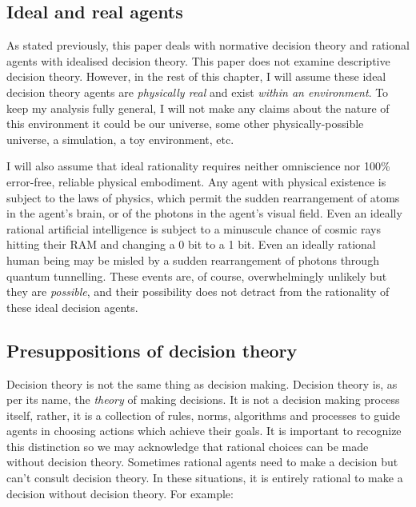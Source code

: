 \documentclass{article}
\begin{document}
\subsection{Ideal and real agents}

As stated previously, this paper deals with normative decision theory and rational agents with idealised decision theory. This paper does not examine descriptive decision theory. However, in the rest of this chapter, I will assume these ideal decision theory agents are \textit{physically real} and exist \textit{within an environment}. To keep my analysis fully general, I will not make any claims about the nature of this environment \textemdash{} it could be our universe, some other physically-possible universe, a simulation, a toy environment, etc.

I will also assume that ideal rationality requires neither omniscience nor 100\% error-free, reliable physical embodiment. Any agent with physical existence is subject to the laws of physics, which permit the sudden rearrangement of atoms in the agent's brain, or of the photons in the agent's visual field. Even an ideally rational artificial intelligence is subject to a minuscule chance of cosmic rays hitting their RAM and changing a 0 bit to a 1 bit. Even an ideally rational human being may be misled by a sudden rearrangement of photons through quantum tunnelling. These events are, of course, overwhelmingly unlikely \textemdash{} but they are \textit{possible}, and their possibility does not detract from the rationality of these ideal decision agents.

\subsection{Presuppositions of decision theory}

Decision theory is not the same thing as decision making. Decision theory is, as per its name, the \textit{theory} of making decisions. It is not a decision making process itself, rather, it is a collection of rules, norms, algorithms and processes to guide agents in choosing actions which achieve their goals. It is important to recognize this distinction so we may acknowledge that rational choices can be made without decision theory. Sometimes rational agents need to make a decision but can't consult decision theory. In these situations, it is entirely rational to make a decision without decision theory. For example:
\end{document}

